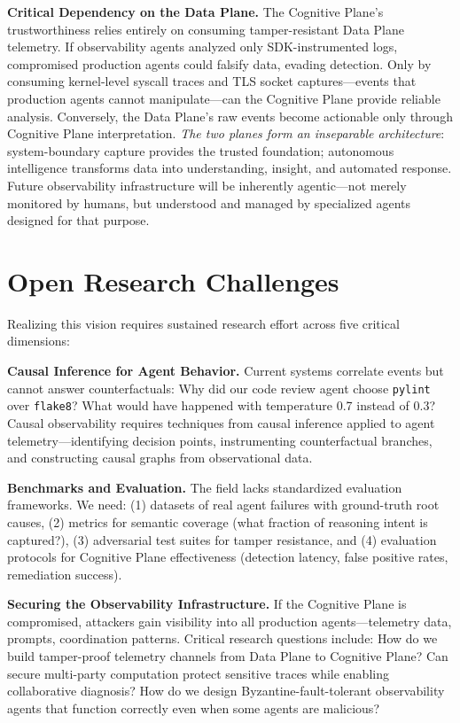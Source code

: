 \documentclass[sigplan,screen,9pt]{acmart}
\begin{document}
\textbf{Critical Dependency on the Data Plane.} The Cognitive Plane's trustworthiness relies entirely on consuming tamper-resistant Data Plane telemetry. If observability agents analyzed only SDK-instrumented logs, compromised production agents could falsify data, evading detection. Only by consuming kernel-level syscall traces and TLS socket captures—events that production agents cannot manipulate—can the Cognitive Plane provide reliable analysis. Conversely, the Data Plane's raw events become actionable only through Cognitive Plane interpretation. \emph{The two planes form an inseparable architecture}: system-boundary capture provides the trusted foundation; autonomous intelligence transforms data into understanding, insight, and automated response. Future observability infrastructure will be inherently agentic—not merely monitored by humans, but understood and managed by specialized agents designed for that purpose.

\section{Open Research Challenges}

Realizing this vision requires sustained research effort across five critical dimensions:

\textbf{Causal Inference for Agent Behavior.} Current systems correlate events but cannot answer counterfactuals: Why did our code review agent choose \texttt{pylint} over \texttt{flake8}? What would have happened with temperature 0.7 instead of 0.3? Causal observability requires techniques from causal inference applied to agent telemetry—identifying decision points, instrumenting counterfactual branches, and constructing causal graphs from observational data.

\textbf{Benchmarks and Evaluation.} The field lacks standardized evaluation frameworks. We need: (1) datasets of real agent failures with ground-truth root causes, (2) metrics for semantic coverage (what fraction of reasoning intent is captured?), (3) adversarial test suites for tamper resistance, and (4) evaluation protocols for Cognitive Plane effectiveness (detection latency, false positive rates, remediation success).

\textbf{Securing the Observability Infrastructure.} If the Cognitive Plane is compromised, attackers gain visibility into all production agents—telemetry data, prompts, coordination patterns. Critical research questions include: How do we build tamper-proof telemetry channels from Data Plane to Cognitive Plane? Can secure multi-party computation protect sensitive traces while enabling collaborative diagnosis? How do we design Byzantine-fault-tolerant observability agents that function correctly even when some agents are malicious?
\end{document}
